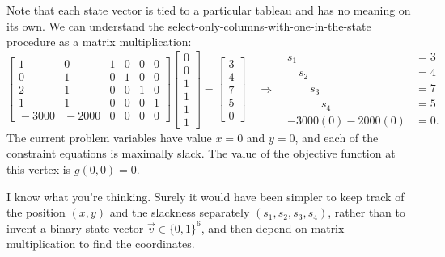 \documentclass[11pt,oneside]{article}
\begin{document}
		Note that each state vector is tied to a particular tableau and has no meaning on its own.
		We can understand the select-only-columns-with-one-in-the-state procedure as a matrix multiplication:
		{\footnotesize
		\[
			\left[
			\begin{array}{rrrrrr}
				    1&     0& 1& 0& 0& 0      \\ 
				    0&     1& 0& 1& 0& 0       \\ 
				    2&     1& 0& 0& 1& 0       \\ 
				    1&     1& 0& 0& 0& 1        \\ 
				\!\!\!-3000& \!\!\!\!-2000& 0& 0& 0& 0  
			\end{array}
			\right]	
			\!\!
			\begin{bmatrix}
				0 \\ 0 \\  1 \\ 1 \\ 1 \\ 1 
			\end{bmatrix}\!
			=
			\!
			\begin{bmatrix}
				3 \\ 4 \\  7 \\ 5 \\ 0 
			\end{bmatrix}			
			\quad	
			\Rightarrow
			\ \ \
			\begin{array}{rl}
					s_1 \quad \quad \quad		\ &=	 3	\\
					\quad s_2 \quad \quad 		\ &= 	 4	\\
					\quad \quad  s_3 \quad 		\ &= 	 7	\\
					 \quad \quad \quad  s_4   		\ &= 	 5	\\
			        - 3000(0)  -   2000(0)     \!\!&=  0.
			\end{array} 				
		\]}%
		The current problem variables have value $x=0$ and $y=0$,
		and each of the constraint equations is maximally slack.
		The value of the objective function at this vertex is $g(0,0)=0$.
		
		I know what you're thinking.
		Surely it would have been simpler to keep track of the position $(x,y)$ 
		and the slackness separately $(s_1,s_2,s_3,s_4)$,
		rather than to invent a binary state vector $\vec{v} \in \{0, 1\}^{6}$,
		and then depend on matrix multiplication to find the coordinates.
		
\end{document}
